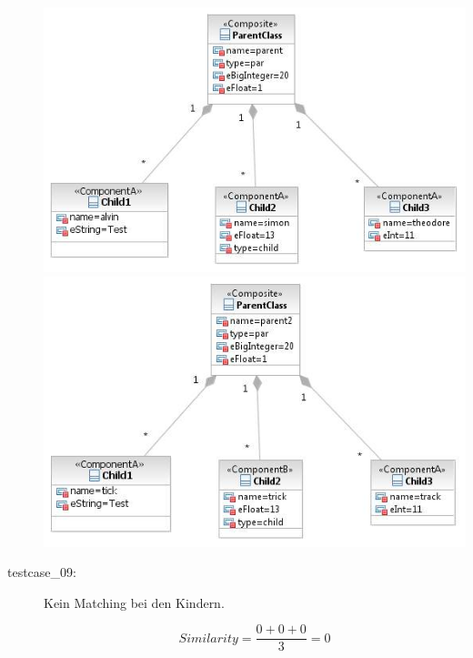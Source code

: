 \documentclass[a4paper]{article}
\begin{document}
\begin{description}
	\includegraphics[scale=0.5]{CompareChildrenMatchedOrSimilarTestScreens/Testcase07model1.jpeg}
	\includegraphics[scale=0.5]{CompareChildrenMatchedOrSimilarTestScreens/Testcase07model2.jpeg}

  \item[testcase\_09:]  Kein Matching bei den Kindern.
    
   \begin{equation*}
   Similarity = \frac{0+0+0}{3}=0
   \end{equation*}
    

\end{description}
\end{document}
